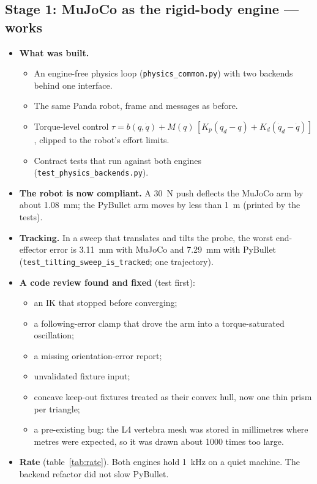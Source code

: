 \documentclass[11pt,a4paper]{article}
\newcommand{\src}[1]{\texttt{\small #1}}
\begin{document}
\subsection{Stage 1: MuJoCo as the rigid-body engine --- works}
\begin{itemize}
  \item \textbf{What was built.}
    \begin{itemize}
      \item An engine-free physics loop (\src{physics\_common.py}) with two backends behind one interface.
      \item The same Panda robot, frame and messages as before.
      \item Torque-level control
        $\tau = b(q,\dot q) + M(q)\,[K_p(q_d-q)+K_d(\dot q_d-\dot q)]$, clipped to the robot's effort limits.
      \item Contract tests that run against both engines (\src{test\_physics\_backends.py}).
    \end{itemize}
  \item \textbf{The robot is now compliant.} A 30~N push deflects the MuJoCo arm by about 1.08~mm; the PyBullet arm
    moves by less than 1~\textmu m (printed by the tests).
  \item \textbf{Tracking.} In a sweep that translates and tilts the probe, the worst end-effector error is
    3.11~mm with MuJoCo and 7.29~mm with PyBullet (\src{test\_tilting\_sweep\_is\_tracked}; one trajectory).
  \item \textbf{A code review found and fixed} (test first):
    \begin{itemize}
      \item an IK that stopped before converging;
      \item a following-error clamp that drove the arm into a torque-saturated oscillation;
      \item a missing orientation-error report;
      \item unvalidated fixture input;
      \item concave keep-out fixtures treated as their convex hull, now one thin prism per triangle;
      \item a pre-existing bug: the L4 vertebra mesh was stored in millimetres where metres were expected, so it was
        drawn about 1000 times too large.
    \end{itemize}
  \item \textbf{Rate} (table~\ref{tab:rate}). Both engines hold 1~kHz on a quiet machine. The backend refactor did
    not slow PyBullet.
\end{itemize}
\end{document}
